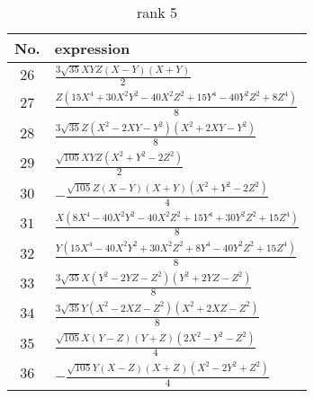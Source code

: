 \documentclass[fleqn,8pt,landscape]{jsarticle}
\begin{document}
\begin{table}[ht!]
\begin{center}
\caption{rank 5}
\renewcommand{\arraystretch}{1.3}
\begin{tabular}{cl} \hline \hline
No. & expression \\ \hline
$ 26 $ & $ \frac{3 \sqrt{35} X Y Z \left(X - Y\right) \left(X + Y\right)}{2} $ \\
$ 27 $ & $ \frac{Z \left(15 X^{4} + 30 X^{2} Y^{2} - 40 X^{2} Z^{2} + 15 Y^{4} - 40 Y^{2} Z^{2} + 8 Z^{4}\right)}{8} $ \\
$ 28 $ & $ \frac{3 \sqrt{35} Z \left(X^{2} - 2 X Y - Y^{2}\right) \left(X^{2} + 2 X Y - Y^{2}\right)}{8} $ \\
$ 29 $ & $ \frac{\sqrt{105} X Y Z \left(X^{2} + Y^{2} - 2 Z^{2}\right)}{2} $ \\
$ 30 $ & $ - \frac{\sqrt{105} Z \left(X - Y\right) \left(X + Y\right) \left(X^{2} + Y^{2} - 2 Z^{2}\right)}{4} $ \\
$ 31 $ & $ \frac{X \left(8 X^{4} - 40 X^{2} Y^{2} - 40 X^{2} Z^{2} + 15 Y^{4} + 30 Y^{2} Z^{2} + 15 Z^{4}\right)}{8} $ \\
$ 32 $ & $ \frac{Y \left(15 X^{4} - 40 X^{2} Y^{2} + 30 X^{2} Z^{2} + 8 Y^{4} - 40 Y^{2} Z^{2} + 15 Z^{4}\right)}{8} $ \\
$ 33 $ & $ \frac{3 \sqrt{35} X \left(Y^{2} - 2 Y Z - Z^{2}\right) \left(Y^{2} + 2 Y Z - Z^{2}\right)}{8} $ \\
$ 34 $ & $ \frac{3 \sqrt{35} Y \left(X^{2} - 2 X Z - Z^{2}\right) \left(X^{2} + 2 X Z - Z^{2}\right)}{8} $ \\
$ 35 $ & $ \frac{\sqrt{105} X \left(Y - Z\right) \left(Y + Z\right) \left(2 X^{2} - Y^{2} - Z^{2}\right)}{4} $ \\
$ 36 $ & $ - \frac{\sqrt{105} Y \left(X - Z\right) \left(X + Z\right) \left(X^{2} - 2 Y^{2} + Z^{2}\right)}{4} $ \\
 \hline \hline
\end{tabular}
\end{center}
\end{table}
\end{document}

